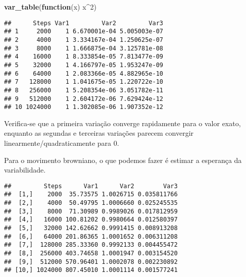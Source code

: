 \documentclass[]{article}
\newenvironment{Shaded}{\begin{snugshade}}{\end{snugshade}}
\newcommand{\KeywordTok}[1]{\textcolor[rgb]{0.13,0.29,0.53}{\textbf{#1}}}
\newcommand{\DataTypeTok}[1]{\textcolor[rgb]{0.13,0.29,0.53}{#1}}
\newcommand{\DecValTok}[1]{\textcolor[rgb]{0.00,0.00,0.81}{#1}}
\newcommand{\StringTok}[1]{\textcolor[rgb]{0.31,0.60,0.02}{#1}}
\newcommand{\CommentTok}[1]{\textcolor[rgb]{0.56,0.35,0.01}{\textit{#1}}}
\newcommand{\ControlFlowTok}[1]{\textcolor[rgb]{0.13,0.29,0.53}{\textbf{#1}}}
\newcommand{\OperatorTok}[1]{\textcolor[rgb]{0.81,0.36,0.00}{\textbf{#1}}}
\newcommand{\NormalTok}[1]{#1}
\begin{document}
\begin{Shaded}
\begin{Highlighting}[]
\KeywordTok{var_table}\NormalTok{(}\ControlFlowTok{function}\NormalTok{(x) x}\OperatorTok{^}\DecValTok{2}\NormalTok{)}
\end{Highlighting}
\end{Shaded}

\begin{verbatim}
##      Steps Var1         Var2         Var3
## 1     2000    1 6.670001e-04 5.005003e-07
## 2     4000    1 3.334167e-04 1.250625e-07
## 3     8000    1 1.666875e-04 3.125781e-08
## 4    16000    1 8.333854e-05 7.813477e-09
## 5    32000    1 4.166797e-05 1.953247e-09
## 6    64000    1 2.083366e-05 4.882965e-10
## 7   128000    1 1.041675e-05 1.220722e-10
## 8   256000    1 5.208354e-06 3.051782e-11
## 9   512000    1 2.604172e-06 7.629424e-12
## 10 1024000    1 1.302085e-06 1.907352e-12
\end{verbatim}

Verifica-se que a primeira variação converge rapidamente para o valor
exato, enquanto as segundas e terceiras variações parecem convergir
linearmente/quadraticamente para 0.

Para o movimento browniano, o que podemos fazer é estimar a esperança da
variabilidade.

\begin{Shaded}
\end{Shaded}

\begin{verbatim}
##         Steps      Var1      Var2        Var3
##  [1,]    2000  35.73575 1.0026715 0.035811766
##  [2,]    4000  50.49795 1.0006660 0.025245535
##  [3,]    8000  71.30989 0.9989026 0.017812959
##  [4,]   16000 100.81202 0.9980664 0.012580397
##  [5,]   32000 142.62662 0.9991415 0.008913208
##  [6,]   64000 201.86365 1.0001652 0.006311208
##  [7,]  128000 285.33360 0.9992133 0.004455472
##  [8,]  256000 403.74658 1.0001947 0.003154520
##  [9,]  512000 570.96401 1.0002078 0.002230892
## [10,] 1024000 807.45010 1.0001114 0.001577241
\end{verbatim}
\end{document}
